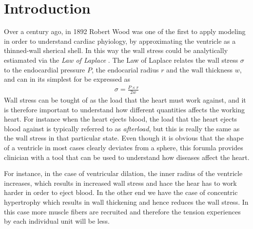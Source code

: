 \chapter{Introduction}









Over a century ago, in 1892 Robert Wood was one of the first to apply modeling
in order to understand cardiac phyiology, by approximating the ventricle as a
thinned-wall sherical shell. In this way the wall stress could be analytically
estiamated via the \emph{Law of Laplace} \cite{woods1892few}. The Law
of Laplace relates the wall stress $\sigma$ to the endocardial
pressure $P$, the endocarial radius $r$ and the wall thickness $w$,
and can in its simplest for be expressed as
\begin{align}
  \sigma = \frac{P \times r}{2 w}
\end{align}
Wall stress can be tought of as the load that the heart must work
against, and it is therefore important to understand how different
quantities affects the working heart. For instance when the heart
ejects blood, the load that the heart ejects blood against is
typically referred to as \emph{afterload}, but this is really the same
as the wall stress in that particular state. 
Even though it is obvious that the shape of a ventricle in most cases
clearly deviates from a sphere, this forumla provides clinician with a tool
that can be used to understand how diseases affect the heart. 

For instance, in the case of ventricular dilation, the inner radius of
the ventricle increases, which results in increased wall stress and
hace the hear has to work harder in order to eject blood. In the other
end we have the case of concentric hypertrophy which results in wall
thickening and hence reduces the wall stress. In this case more muscle
fibers are recruited and therefore the tension experiences by each
individual unit will be less. 

